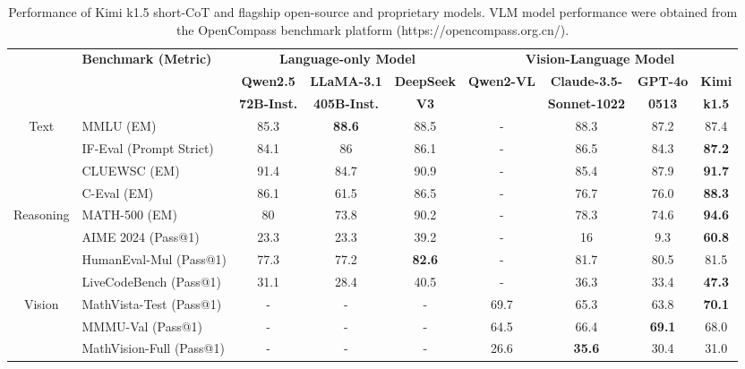 
\begin{table}[h]
    \centering
    \footnotesize
    \setlength{\tabcolsep}{2.5pt}
    \begin{tabular}{@{}c l | c c c | c c c  c@{}}
    \toprule
    & \multirow{3}{*}{\centering \textbf{Benchmark {\tiny (Metric)}}} 
    & \multicolumn{3}{c|}{\textbf{Language-only Model}} 
    & \multicolumn{4}{c}{\textbf{Vision-Language Model}} \\ 
    & & \textbf{Qwen2.5} & \textbf{LLaMA-3.1} & \textbf{DeepSeek} & \textbf{Qwen2-VL} & \textbf{Claude-3.5-} & \textbf{GPT-4o}  & \textbf{Kimi} \\
    & & \textbf{72B-Inst.} & \textbf{405B-Inst.} & \textbf{V3}  & & \textbf{Sonnet-1022} & \textbf{0513} & \textbf{k1.5} \\
    \midrule
    
    \multirow{4}{*}{Text}
    & MMLU {\tiny (EM)}   & 85.3 & \textbf{88.6} & 88.5 & - & 88.3 & 87.2 & 87.4 \\
    & IF-Eval {\tiny (Prompt Strict)}  & 84.1 & 86 & 86.1 & - & 86.5 & 84.3 & \textbf{87.2} \\
    & CLUEWSC  {\tiny (EM)} & 91.4 & 84.7 & 90.9 & - & 85.4 & 87.9 & \textbf{91.7} \\
    & C-Eval  {\tiny (EM)}  & 86.1 & 61.5 & 86.5 & - & 76.7 & 76.0 & \textbf{88.3} \\
    \midrule
    
    \multirow{4}{*}{Reasoning} 
    & MATH-500 {\tiny (EM)} & 80 & 73.8 & 90.2 & - & 78.3 & 74.6 & \textbf{94.6} \\
    & AIME 2024 {\tiny (Pass@1)} & 23.3 & 23.3 & 39.2 & - & 16 & 9.3 & \textbf{60.8} \\
    & HumanEval-Mul {\tiny (Pass@1)}  & 77.3 & 77.2 & \textbf{82.6} & - & 81.7 & 80.5 & 81.5 \\
    & LiveCodeBench {\tiny (Pass@1)} & 31.1 & 28.4 & 40.5 & - & 36.3 & 33.4 & \textbf{47.3} \\
    \midrule
    
    \multirow{3}{*}{Vision} 
    & MathVista-Test {\tiny (Pass@1)} & - & - & - & 69.7 & 65.3 & 63.8 & \textbf{70.1} \\
    & MMMU-Val {\tiny (Pass@1)} & - & - & - & 64.5 & 66.4 & \textbf{69.1} & 68.0 \\
    & MathVision-Full {\tiny (Pass@1)} & - & - & - & 26.6 & \textbf{35.6} & 30.4 & 31.0 \\
 
    \bottomrule
    \end{tabular}
    \caption{Performance of Kimi k1.5 short-CoT and flagship open-source and proprietary models. VLM model performance were obtained from the OpenCompass benchmark platform (https://opencompass.org.cn/).}
    \label{tab:short_perf}
\end{table}